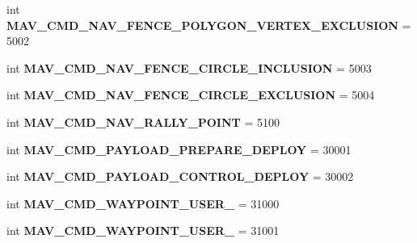 \begin{DoxyCompactItemize}
int {\bfseries M\+A\+V\+\_\+\+C\+M\+D\+\_\+\+N\+A\+V\+\_\+\+F\+E\+N\+C\+E\+\_\+\+P\+O\+L\+Y\+G\+O\+N\+\_\+\+V\+E\+R\+T\+E\+X\+\_\+\+E\+X\+C\+L\+U\+S\+I\+ON} = 5002
\item 
\mbox{\label{namespacepymavlink_1_1dialects_1_1v10_a77175c7e52083db04f9f1fabb2a11b76}} 
int {\bfseries M\+A\+V\+\_\+\+C\+M\+D\+\_\+\+N\+A\+V\+\_\+\+F\+E\+N\+C\+E\+\_\+\+C\+I\+R\+C\+L\+E\+\_\+\+I\+N\+C\+L\+U\+S\+I\+ON} = 5003
\item 
\mbox{\label{namespacepymavlink_1_1dialects_1_1v10_abef8b0c3e49195dcba3d461a4eb06066}} 
int {\bfseries M\+A\+V\+\_\+\+C\+M\+D\+\_\+\+N\+A\+V\+\_\+\+F\+E\+N\+C\+E\+\_\+\+C\+I\+R\+C\+L\+E\+\_\+\+E\+X\+C\+L\+U\+S\+I\+ON} = 5004
\item 
\mbox{\label{namespacepymavlink_1_1dialects_1_1v10_ae6ec3984852a4f3cf46571d6346ffde8}} 
int {\bfseries M\+A\+V\+\_\+\+C\+M\+D\+\_\+\+N\+A\+V\+\_\+\+R\+A\+L\+L\+Y\+\_\+\+P\+O\+I\+NT} = 5100
\item 
\mbox{\label{namespacepymavlink_1_1dialects_1_1v10_a08e336714d3cd58aa1727e4587a67a1b}} 
int {\bfseries M\+A\+V\+\_\+\+C\+M\+D\+\_\+\+P\+A\+Y\+L\+O\+A\+D\+\_\+\+P\+R\+E\+P\+A\+R\+E\+\_\+\+D\+E\+P\+L\+OY} = 30001
\item 
\mbox{\label{namespacepymavlink_1_1dialects_1_1v10_a0c61a8424f1358b885296734e3c2bdba}} 
int {\bfseries M\+A\+V\+\_\+\+C\+M\+D\+\_\+\+P\+A\+Y\+L\+O\+A\+D\+\_\+\+C\+O\+N\+T\+R\+O\+L\+\_\+\+D\+E\+P\+L\+OY} = 30002
\item 
\mbox{\label{namespacepymavlink_1_1dialects_1_1v10_a04ad1128902ecfcb67b14f46bf13adf7}} 
int {\bfseries M\+A\+V\+\_\+\+C\+M\+D\+\_\+\+W\+A\+Y\+P\+O\+I\+N\+T\+\_\+\+U\+S\+E\+R\+\_} = 31000
\item 
\mbox{\label{namespacepymavlink_1_1dialects_1_1v10_a71caa706614e012385a42b920ce9523f}} 
int {\bfseries M\+A\+V\+\_\+\+C\+M\+D\+\_\+\+W\+A\+Y\+P\+O\+I\+N\+T\+\_\+\+U\+S\+E\+R\+\_} = 31001
\item 
\mbox{\label{namespacepymavlink_1_1dialects_1_1v10_aaa7c4a58342e8ced1abf1e3f900778e9}} 

\end{DoxyCompactItemize}
